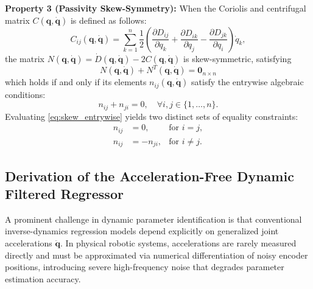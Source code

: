 \documentclass[lettersize,journal]{IEEEtran}
\begin{document}
\noindent\textbf{Property 3 (Passivity Skew-Symmetry):} When the Coriolis and centrifugal matrix $C(\bm{q}, \dot{\bm{q}})$ is defined as follows:
\begin{equation}
	C_{ij}(\bm{q}, \dot{\bm{q}}) = \sum_{k=1}^n \frac{1}{2} \left( \frac{\partial D_{ij}}{\partial q_k} + \frac{\partial D_{ik}}{\partial q_j} - \frac{\partial D_{jk}}{\partial q_i} \right) \dot{q}_k,
	\label{eq:christoffel}
\end{equation}
the matrix $N(\bm{q}, \dot{\bm{q}})=\dot{D}(\bm{q}, \dot{\bm{q}})-2C(\bm{q}, \dot{\bm{q}})$ is skew-symmetric, satisfying 
\begin{equation*}
	N(\bm{q}, \dot{\bm{q}})+N^{T}(\bm{q}, \dot{\bm{q}})=\mathbf{0}_{n\times n}
\end{equation*}
which holds if and only if its elements $n_{ij}(\bm{q}, \dot{\bm{q}})$ satisfy the entrywise algebraic conditions:
\begin{equation}
	n_{ij} + n_{ji} = 0, \quad \forall i, j \in \{1, \dots, n\}.
	\label{eq:skew_entrywise}
\end{equation}
Evaluating \eqref{eq:skew_entrywise} yields two distinct sets of equality constraints:
\begin{align}
	n_{ij} &= 0, & \text{for } i = j, \label{eq:skew_diag} \\
	n_{ij} &= -n_{ji}, & \text{for } i \neq j. \label{eq:skew_offdiag}
\end{align}

\subsection{Derivation of the Acceleration-Free Dynamic Filtered Regressor} \label{sec:filtered_derivation}
A prominent challenge in dynamic parameter identification is that conventional inverse-dynamics regression models depend explicitly on generalized joint accelerations $\ddot{\bm{q}}$. In physical robotic systems, accelerations are rarely measured directly and must be approximated via numerical differentiation of noisy encoder positions, introducing severe high-frequency noise that degrades parameter estimation accuracy.
\end{document}
